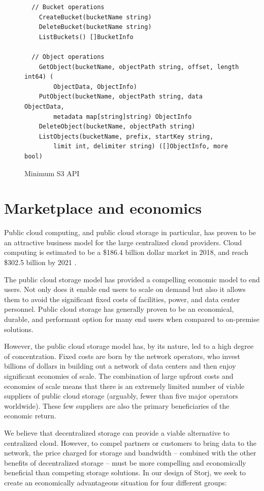 \documentclass[8pt,fleqn,openany]{book}
\begin{document}
\begin{figure}
\lstset{language=Golang}
\begin{lstlisting}
  // Bucket operations
	CreateBucket(bucketName string)
	DeleteBucket(bucketName string)
	ListBuckets() []BucketInfo

  // Object operations
	GetObject(bucketName, objectPath string, offset, length int64) (
	    ObjectData, ObjectInfo)
	PutObject(bucketName, objectPath string, data ObjectData,
	    metadata map[string]string) ObjectInfo
	DeleteObject(bucketName, objectPath string)
	ListObjects(bucketName, prefix, startKey string,
	    limit int, delimiter string) ([]ObjectInfo, more bool)
\end{lstlisting}
\caption{Minimum S3 API}
\label{fig:s3-api-code}
\end{figure}

\section{Marketplace and economics}

Public cloud computing, and public cloud storage in particular, has
proven to be an attractive business model for the large centralized cloud
providers. Cloud computing is estimated to be a \$186.4 billion dollar market
in 2018, and reach \$302.5 billion by 2021 \cite{gartner-cloud-growth}.

The public cloud storage model has provided a compelling economic model to end
users. Not only does it enable end users to scale on demand but also it allows them to avoid the significant fixed costs of facilities, power, and data center
personnel. Public cloud storage has generally proven to be an economical,
durable, and performant option for many end users when compared to
on-premise solutions.

However, the public cloud storage model has, by its nature, led to a high
degree of concentration. Fixed costs are born by the network operators, who
invest billions of dollars in building out a network of data centers and
then enjoy significant economies of scale. The combination of large upfront
costs and economies of scale means that there is an extremely limited number
of viable suppliers of public cloud storage (arguably, fewer than five major
operators worldwide). These few suppliers are also the primary beneficiaries of
the economic return.

We believe that decentralized storage can provide a viable alternative to
centralized cloud.
However, to compel partners or customers to bring data to the network,
the price charged for storage and bandwidth -- combined with the other
benefits of decentralized storage -- must be
more compelling and economically beneficial than competing storage solutions.
In our design of Storj, we seek to create an economically advantageous
situation for four different groups:
\end{document}
